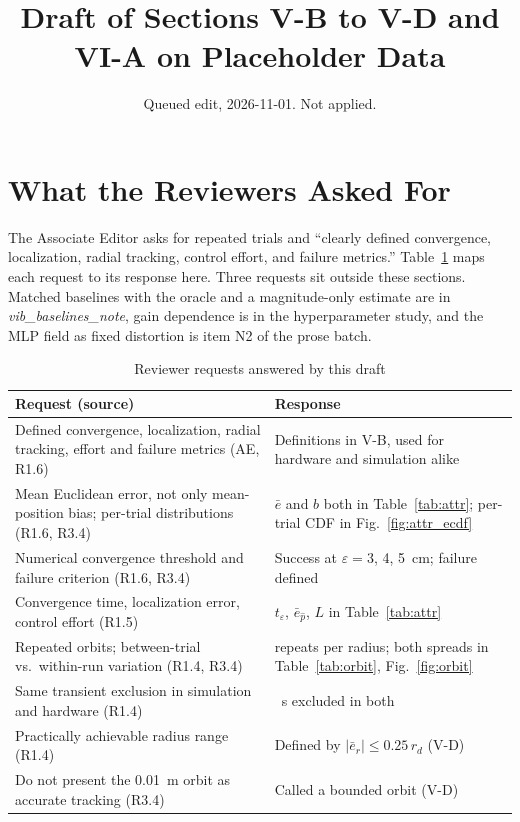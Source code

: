 \documentclass[lettersize,journal]{IEEEtran}
\begin{document}
\title{Draft of Sections V-B to V-D and VI-A on Placeholder Data}
\author{Queued edit, 2026-11-01. Not applied.}
\maketitle

\noindent{}

\section*{What the Reviewers Asked For}

The Associate Editor asks for repeated trials and ``clearly defined convergence, localization, radial tracking, control effort, and failure metrics.'' Table~\ref{tab:requests} maps each request to its response here. Three requests sit outside these sections. Matched baselines with the oracle and a magnitude-only estimate are in \textit{vib\_baselines\_note}, gain dependence is in the hyperparameter study, and the MLP field as fixed distortion is item N2 of the prose batch.

\begin{table}[!h]
\footnotesize
\centering
\caption{Reviewer requests answered by this draft}
\label{tab:requests}
\setlength{\tabcolsep}{3pt}
\begin{tabular}{>{\raggedright}p{}>{\raggedright\arraybackslash}p{}}
\hline
\textbf{Request (source)} & \textbf{Response} \\
\hline
Defined convergence, localization, radial tracking, effort and failure metrics (AE, R1.6) & Definitions in V-B, used for hardware and simulation alike \\
Mean Euclidean error, not only mean-position bias; per-trial distributions (R1.6, R3.4) & $\bar e$ and $b$ both in Table~\ref{tab:attr}; per-trial CDF in Fig.~\ref{fig:attr_ecdf} \\
Numerical convergence threshold and failure criterion (R1.6, R3.4) & Success at $\varepsilon = 3$, 4, 5~cm; failure defined \\
Convergence time, localization error, control effort (R1.5) & $t_\varepsilon$, $\bar e_{\hat p}$, $L$ in Table~\ref{tab:attr} \\
Repeated orbits; between-trial vs.\ within-run variation (R1.4, R3.4) & 10 repeats per radius; both spreads in Table~\ref{tab:orbit}, Fig.~\ref{fig:orbit} \\
Same transient exclusion in simulation and hardware (R1.4) & 10~s excluded in both \\
Practically achievable radius range (R1.4) & Defined by $|\bar e_r| \le 0.25\,r_d$ (V-D) \\
Do not present the 0.01~m orbit as accurate tracking (R3.4) & Called a bounded orbit (V-D) \\
\hline
\end{tabular}
\end{table}
\end{document}
